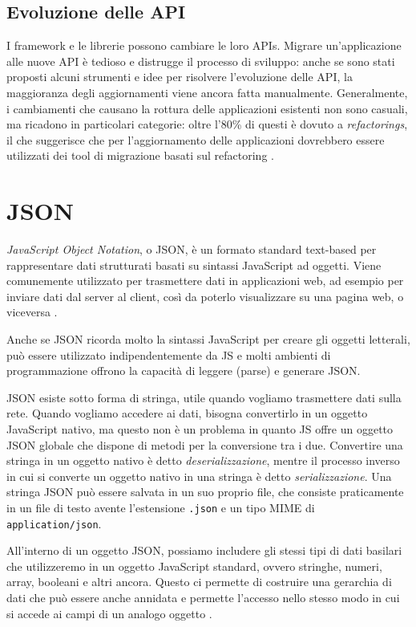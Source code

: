 \subsection{Evoluzione delle API}
I framework e le librerie possono cambiare le loro APIs. Migrare un'applicazione alle nuove API è tedioso e distrugge il processo di sviluppo: anche se sono stati proposti alcuni strumenti e idee per risolvere l'evoluzione delle API, la maggioranza degli aggiornamenti viene ancora fatta manualmente. Generalmente, i cambiamenti che causano la rottura delle applicazioni esistenti non sono casuali, ma ricadono in particolari categorie: oltre l'80\% di questi è dovuto a \textit{refactorings}, il che suggerisce che per l'aggiornamento delle applicazioni dovrebbero essere utilizzati dei tool di migrazione basati sul refactoring \cite{API_Evolution}.

\section{JSON}
\textit{JavaScript Object Notation}, o JSON, è un formato standard text-based per rappresentare dati strutturati basati su sintassi JavaScript ad oggetti. Viene comunemente utilizzato per trasmettere dati in applicazioni web, ad esempio per inviare dati dal server al client, così da poterlo visualizzare su una pagina web, o viceversa \cite{JSON, JSON_Docs}.

Anche se JSON ricorda molto la sintassi JavaScript per creare gli oggetti letterali, può essere utilizzato indipendentemente da JS e molti ambienti di programmazione offrono la capacità di leggere (parse) e generare JSON.

JSON esiste sotto forma di stringa, utile quando vogliamo trasmettere dati sulla rete. Quando vogliamo accedere ai dati, bisogna convertirlo in un oggetto JavaScript nativo, ma questo non è un problema in quanto JS offre un oggetto JSON globale che dispone di metodi per la conversione tra i due. Convertire una stringa in un oggetto nativo è detto \textit{deserializzazione}, mentre il processo inverso in cui si converte un oggetto nativo in una stringa è detto \textit{serializzazione}. Una stringa JSON può essere salvata in un suo proprio file, che consiste praticamente in un file di testo avente l'estensione \Verb_.json_ e un tipo MIME di \Verb_application/json_.

All'interno di un oggetto JSON, possiamo includere gli stessi tipi di dati basilari che utilizzeremo in un oggetto JavaScript standard, ovvero stringhe, numeri, array, booleani e altri ancora. Questo ci permette di costruire una gerarchia di dati che può essere anche annidata e permette l'accesso nello stesso modo in cui si accede ai campi di un analogo oggetto \cite{JSON}.

